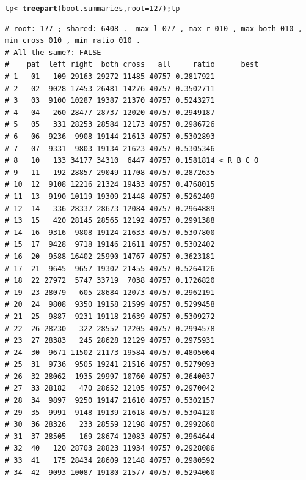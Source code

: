 \documentclass{article}\usepackage[]{graphicx}\usepackage[]{color}
\makeatletter
\newcommand{\hlnum}[1]{\textcolor[rgb]{0.686,0.059,0.569}{#1}}%
\newcommand{\hlstd}[1]{\textcolor[rgb]{0.345,0.345,0.345}{#1}}%
\newcommand{\hlkwb}[1]{\textcolor[rgb]{0.69,0.353,0.396}{#1}}%
\newcommand{\hlkwc}[1]{\textcolor[rgb]{0.333,0.667,0.333}{#1}}%
\newcommand{\hlkwd}[1]{\textcolor[rgb]{0.737,0.353,0.396}{\textbf{#1}}}%
\newenvironment{kframe}{%
 \def\at@end@of@kframe{}%
 \ifinner\ifhmode%
  \def\at@end@of@kframe{\end{minipage}}%
  \begin{minipage}{\columnwidth}%
 \fi\fi%
 \def\FrameCommand##1{\hskip\@totalleftmargin \hskip-\fboxsep
 \colorbox{shadecolor}{##1}\hskip-\fboxsep
     \hskip-\linewidth \hskip-\@totalleftmargin \hskip\columnwidth}%
 \MakeFramed {\advance\hsize-\width
   \@totalleftmargin\z@ \linewidth\hsize
   \@setminipage}}%
 {\par\unskip\endMakeFramed%
 \at@end@of@kframe}
\newenvironment{knitrout}{}{} %
\makeatother
\begin{document}
\begin{knitrout}\scriptsize
{}\color{fgcolor}\begin{kframe}
\begin{alltt}
\hlstd{tp} \hlkwb{<-} \hlkwd{treepart}\hlstd{(boot.summaries,}\hlkwc{root}\hlstd{=}\hlnum{127}\hlstd{) ; tp}
\end{alltt}
\begin{verbatim}
# root: 177 ; shared: 6408 .  max l 077 , max r 010 , max both 010 , min cross 010 , min ratio 010 . 
# All the same?: FALSE
#    pat  left right  both cross   all     ratio      best
# 1   01   109 29163 29272 11485 40757 0.2817921          
# 2   02  9028 17453 26481 14276 40757 0.3502711          
# 3   03  9100 10287 19387 21370 40757 0.5243271          
# 4   04   260 28477 28737 12020 40757 0.2949187          
# 5   05   331 28253 28584 12173 40757 0.2986726          
# 6   06  9236  9908 19144 21613 40757 0.5302893          
# 7   07  9331  9803 19134 21623 40757 0.5305346          
# 8   10   133 34177 34310  6447 40757 0.1581814 < R B C O
# 9   11   192 28857 29049 11708 40757 0.2872635          
# 10  12  9108 12216 21324 19433 40757 0.4768015          
# 11  13  9190 10119 19309 21448 40757 0.5262409          
# 12  14   336 28337 28673 12084 40757 0.2964889          
# 13  15   420 28145 28565 12192 40757 0.2991388          
# 14  16  9316  9808 19124 21633 40757 0.5307800          
# 15  17  9428  9718 19146 21611 40757 0.5302402          
# 16  20  9588 16402 25990 14767 40757 0.3623181          
# 17  21  9645  9657 19302 21455 40757 0.5264126          
# 18  22 27972  5747 33719  7038 40757 0.1726820          
# 19  23 28079   605 28684 12073 40757 0.2962191          
# 20  24  9808  9350 19158 21599 40757 0.5299458          
# 21  25  9887  9231 19118 21639 40757 0.5309272          
# 22  26 28230   322 28552 12205 40757 0.2994578          
# 23  27 28383   245 28628 12129 40757 0.2975931          
# 24  30  9671 11502 21173 19584 40757 0.4805064          
# 25  31  9736  9505 19241 21516 40757 0.5279093          
# 26  32 28062  1935 29997 10760 40757 0.2640037          
# 27  33 28182   470 28652 12105 40757 0.2970042          
# 28  34  9897  9250 19147 21610 40757 0.5302157          
# 29  35  9991  9148 19139 21618 40757 0.5304120          
# 30  36 28326   233 28559 12198 40757 0.2992860          
# 31  37 28505   169 28674 12083 40757 0.2964644          
# 32  40   120 28703 28823 11934 40757 0.2928086          
# 33  41   175 28434 28609 12148 40757 0.2980592          
# 34  42  9093 10087 19180 21577 40757 0.5294060          

\end{verbatim}
\end{kframe}
\end{knitrout}
\end{document}
